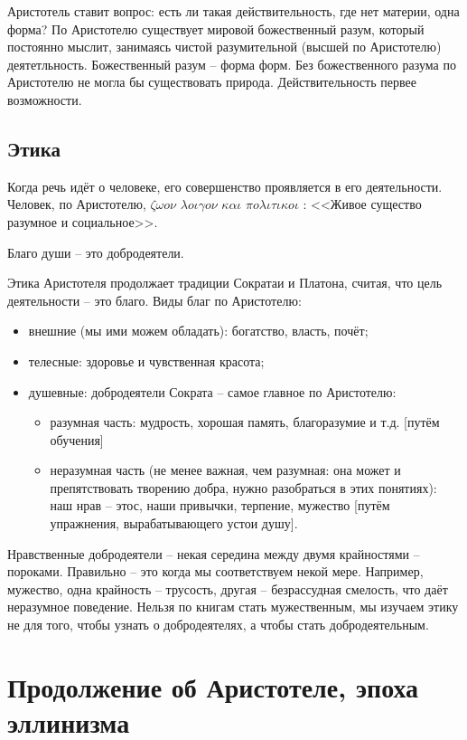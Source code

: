 \documentclass[a4paper, 12pt]{book} %
\begin{document}
Аристотель ставит вопрос: есть ли такая действительность, где нет материи, одна форма? По Аристотелю существует мировой божественный разум, который постоянно мыслит, занимаясь чистой разумительной (высшей по Аристотелю) деятетльность. Божественный разум -- форма форм. Без божественного разума по Аристотелю не могла бы существовать природа. Действительность первее возможности.

\subsection{Этика}

Когда речь идёт о человеке, его совершенство проявляется в его деятельности. Человек, по Аристотелю, $\zeta \omega o \nu$ $\lambda o \iota \gamma o \nu$ $\kappa  \alpha \iota$ $\pi o \lambda \iota \tau \iota \kappa o \iota $ : <<Живое существо разумное и социальное>>. 

Благо души -- это добродеятели.

Этика Аристотеля продолжает традиции Сократаи и Платона, считая, что цель деятельности -- это благо. Виды благ по Аристотелю:
\begin{itemize}
\item внешние (мы ими можем обладать): богатство, власть, почёт;
\item телесные: здоровье и чувственная красота;
\item душевные: добродеятели Сократа -- самое главное по Аристотелю:
\begin{itemize}
\item разумная часть: мудрость, хорошая память, благоразумие и т.д. [путём обучения]
\item неразумная часть (не менее важная, чем разумная: она может и препятствовать творению добра, нужно разобраться в этих понятиях): наш нрав -- этос, наши привычки, терпение, мужество [путём упражнения, вырабатывающего устои душу].
\end{itemize}
\end{itemize}
Нравственные добродеятели -- некая середина между двумя крайностями -- пороками. Правильно -- это когда мы соответствуем некой мере. Например, мужество, одна крайность -- трусость, другая -- безрассудная смелость, что даёт неразумное поведение. Нельзя по книгам стать мужественным, мы изучаем этику не для того, чтобы узнать о добродеятелях, а чтобы стать добродеятельным.


\section{Продолжение об Аристотеле, эпоха эллинизма}
\end{document}

